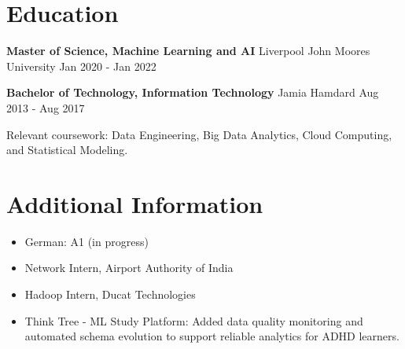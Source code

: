\documentclass[10pt,a4paper]{article}
\begin{document}
\section{Education}
\textbf{Master of Science, Machine Learning and AI} \textbar{} Liverpool John Moores University \hfill Jan 2020 - Jan 2022\par
\textbf{Bachelor of Technology, Information Technology} \textbar{} Jamia Hamdard \hfill Aug 2013 - Aug 2017\par
Relevant coursework: Data Engineering, Big Data Analytics, Cloud Computing, and Statistical Modeling.\par

\section{Additional Information}
\begin{itemize}
  \item German: A1 (in progress)
  \item Network Intern, Airport Authority of India
  \item Hadoop Intern, Ducat Technologies
  \item Think Tree - ML Study Platform: Added data quality monitoring and automated schema evolution to support reliable analytics for ADHD learners.
\end{itemize}
\end{document}
